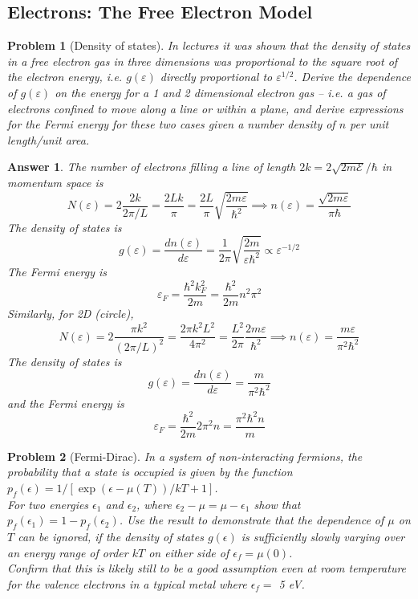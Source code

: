 \documentclass[a4paper]{article}
\newtheorem{ans}{Answer}[section]
\theoremstyle{new}
\newtheorem{qns}{Problem}[section]
\begin{document}
\subsection*{Electrons: The Free Electron Model}
\begin{qns}[Density of states]
In lectures it was shown that the density of states in a free electron gas in three dimensions was proportional to the square root of the electron energy, i.e. $g(\varepsilon)$ directly proportional to $\varepsilon^{1/2}$. Derive the dependence of $g(\varepsilon)$ on the energy for a 1 and 2 dimensional electron gas – i.e. a gas of electrons confined to move along a line or within a plane, and derive expressions for the Fermi energy for these two cases given a number density of $n$ per unit length/unit area.
\end{qns}
\begin{ans}
The number of electrons filling a line of length $2k=2\sqrt{2m\mathcal{E}}/\hbar$ in momentum space is
$$N(\varepsilon)=2\frac{2k}{2\pi/L}=\frac{2Lk}{\pi}=\frac{2L}{\pi}\sqrt{\frac{2m\varepsilon}{\hbar^2}}\implies n(\varepsilon)=\frac{\sqrt{2m\varepsilon}}{\pi\hbar}$$
The density of states is
$$g(\varepsilon)=\frac{dn(\varepsilon)}{d\varepsilon}=\frac{1}{2\pi}\sqrt{\frac{2m}{\varepsilon\hbar^2}}\propto \varepsilon^{-1/2}$$
The Fermi energy is 
$$\varepsilon_F=\frac{\hbar^2k_F^2}{2m}=\frac{\hbar^2}{2m}n^2\pi^2$$
Similarly, for 2D (circle),
$$N(\varepsilon)=2\frac{\pi k^2}{(2\pi/L)^2}=\frac{2\pi k^2L^2}{4\pi^2}=\frac{L^2}{2\pi}\frac{2m\varepsilon}{\hbar^2}\implies n(\varepsilon)=\frac{m\varepsilon}{\pi^2\hbar^2}$$
The density of states is
$$g(\varepsilon)=\frac{dn(\varepsilon)}{d\varepsilon}=\frac{m}{\pi^2\hbar^2}$$
and the Fermi energy is
$$\varepsilon_F=\frac{\hbar^2}{2m}2\pi^2n=\frac{\pi^2\hbar^2n}{m}$$
\end{ans}
\begin{qns}[Fermi-Dirac]
In a system of non-interacting fermions, the probability that a state is occupied is given by the function $p_f(\epsilon) = 1 / [\exp{(\epsilon - \mu(T) ) / kT} + 1]$.\\[5pt]
For two energies $\epsilon_1$ and $\epsilon_2$, where $\epsilon_2-\mu=\mu-\epsilon_1$ show that $p_f(\epsilon_1) = 1- p_f(\epsilon_2)$. Use the result to demonstrate that the dependence of $\mu$ on $T$ can be ignored, if the density of states $g(\epsilon)$ is sufficiently slowly varying over an energy range of order $kT$ on either side of $\epsilon_f=\mu(0)$.\\[5pt]
Confirm that this is likely still to be a good assumption even at room temperature for the valence electrons in a typical metal where $\epsilon_f=$ 5 eV.
\end{qns}
\end{document}
